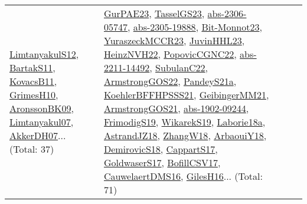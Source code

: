 {\begin{longtable}{lp{3cm}>{\raggedright}p{6cm}>{\raggedright}p{6cm}p{8cm}}
\href{articles/LimtanyakulS12.pdf}{LimtanyakulS12}\cite{LimtanyakulS12}, \href{articles/BartakS11.pdf}{BartakS11}\cite{BartakS11}, \href{articles/KovacsB11.pdf}{KovacsB11}\cite{KovacsB11}, \href{papers/GrimesH10.pdf}{GrimesH10}\cite{GrimesH10}, \href{papers/AronssonBK09.pdf}{AronssonBK09}\cite{AronssonBK09}, \href{papers/Limtanyakul07.pdf}{Limtanyakul07}\cite{Limtanyakul07}, \href{papers/AkkerDH07.pdf}{AkkerDH07}\cite{AkkerDH07}... (Total: 37) & \href{articles/GurPAE23.pdf}{GurPAE23}\cite{GurPAE23}, \href{papers/TasselGS23.pdf}{TasselGS23}\cite{TasselGS23}, \href{articles/abs-2306-05747.pdf}{abs-2306-05747}\cite{abs-2306-05747}, \href{articles/abs-2305-19888.pdf}{abs-2305-19888}\cite{abs-2305-19888}, \href{papers/Bit-Monnot23.pdf}{Bit-Monnot23}\cite{Bit-Monnot23}, \href{articles/YuraszeckMCCR23.pdf}{YuraszeckMCCR23}\cite{YuraszeckMCCR23}, \href{papers/JuvinHHL23.pdf}{JuvinHHL23}\cite{JuvinHHL23}, \href{articles/HeinzNVH22.pdf}{HeinzNVH22}\cite{HeinzNVH22}, \href{papers/PopovicCGNC22.pdf}{PopovicCGNC22}\cite{PopovicCGNC22}, \href{articles/abs-2211-14492.pdf}{abs-2211-14492}\cite{abs-2211-14492}, \href{articles/SubulanC22.pdf}{SubulanC22}\cite{SubulanC22}, \href{papers/ArmstrongGOS22.pdf}{ArmstrongGOS22}\cite{ArmstrongGOS22}, \href{articles/PandeyS21a.pdf}{PandeyS21a}\cite{PandeyS21a}, \href{articles/KoehlerBFFHPSSS21.pdf}{KoehlerBFFHPSSS21}\cite{KoehlerBFFHPSSS21}, \href{papers/GeibingerMM21.pdf}{GeibingerMM21}\cite{GeibingerMM21}, \href{papers/ArmstrongGOS21.pdf}{ArmstrongGOS21}\cite{ArmstrongGOS21}, \href{articles/abs-1902-09244.pdf}{abs-1902-09244}\cite{abs-1902-09244}, \href{papers/FrimodigS19.pdf}{FrimodigS19}\cite{FrimodigS19}, \href{articles/WikarekS19.pdf}{WikarekS19}\cite{WikarekS19}, \href{papers/Laborie18a.pdf}{Laborie18a}\cite{Laborie18a}, \href{papers/AstrandJZ18.pdf}{AstrandJZ18}\cite{AstrandJZ18}, \href{articles/ZhangW18.pdf}{ZhangW18}\cite{ZhangW18}, \href{papers/ArbaouiY18.pdf}{ArbaouiY18}\cite{ArbaouiY18}, \href{papers/DemirovicS18.pdf}{DemirovicS18}\cite{DemirovicS18}, \href{papers/CappartS17.pdf}{CappartS17}\cite{CappartS17}, \href{papers/GoldwaserS17.pdf}{GoldwaserS17}\cite{GoldwaserS17}, \href{papers/BofillCSV17.pdf}{BofillCSV17}\cite{BofillCSV17}, \href{papers/CauwelaertDMS16.pdf}{CauwelaertDMS16}\cite{CauwelaertDMS16}, \href{papers/GilesH16.pdf}{GilesH16}\cite{GilesH16}... (Total: 71)\\

\end{longtable}}
